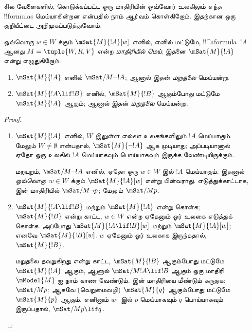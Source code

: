 \documentclass[../../../include/open-logic-section]{subfiles}
\begin{document}


சில வேளைகளில், கொடுக்கப்பட்ட ஒரு மாதிரியின் ஒவ்வோர் உலகிலும் எந்த
!!{formula}s மெய்யாகின்றன என்பதில் நாம் ஆர்வம் கொள்கிறோம். இதற்கான ஒரு
குறியீட்டை அறிமுகப்படுத்துவோம்.

\begin{defn}
  ஒவ்வொரு $w \in W$ க்கும் $\mSat{M}{!A}[w]$ எனில், எனில் மட்டுமே,
  !!^a{formula}~$!A$ ஆனது $M = \tuple{W, R, V}$ என்ற \emph{மாதிரியில்
  மெய்}; இதனை $\mSat{M}{!A}$ என்று எழுதுகிறோம்.
\end{defn}

\begin{prop}
  \begin{enumerate}
  \item $\mSat{M}{!A}$ எனில் $\mSat/{M}{\lnot !A}$; ஆனால் இதன்
    \emph{மறுதலை} மெய்யன்று.
  \item $\mSat{M}{!A \lif !B}$ எனில், $\mSat{M}{!B}$ ஆகும்போது மட்டுமே
    $\mSat{M}{!A}$ ஆகும்; ஆனால் இதன் \emph{மறுதலை} மெய்யன்று.
  \end{enumerate}
\end{prop}

\begin{proof}
  \begin{enumerate}
  \item $\mSat{M}{!A}$ எனில், $W$ இலுள்ள எல்லா உலகங்களிலும் $!A$
    மெய்யாகும். மேலும் $W \neq \emptyset$ என்பதால்,
    $\mSat{M}{\lnot!A}$ ஆக முடியாது; அப்படியானால் ஏதோ ஒரு உலகில் $!A$
    மெய்யாகவும் பொய்யாகவும் இருக்க வேண்டியிருக்கும்.

    மறுபுறம், $\mSat/{M}{\lnot !A}$ எனில், ஏதோ ஒரு $w \in W$ இல் $!A$
    மெய்யாகும். இதனால் \emph{ஒவ்வொரு}~$w \in W$ க்கும்
    $\mSat{M}{!A}[w]$ என்று பின்வராது. எடுத்துக்காட்டாக,
     இன் மாதிரியில் $\mSat/{M}{\lnot p}$; மேலும்
    $\mSat/{M}{p}$.
  \item $\mSat{M}{!A \lif !B}$ மற்றும் $\mSat{M}{!A}$ என்று கொள்க;
    $\mSat{M}{!B}$ என்று காட்ட, $w \in W$ என்ற ஏதேனும் ஓர் உலகை எடுத்துக்
    கொள்க. அப்போது $\mSat{M}{!A \lif !B}[w]$ மற்றும்
    $\mSat{M}{!A}[w]$; எனவே $\mSat{M}{!B}[w]$. $w$ ஏதேனும் ஓர் உலகாக
    இருந்ததால், $\mSat{M}{!B}$.

    மறுதலை தவறுகிறது என்று காட்ட, $\mSat{M}{!B}$ ஆகும்போது மட்டுமே
    $\mSat{M}{!A}$ ஆகும், ஆனால் $\mSat/{M}{!A \lif !B}$ ஆகும் ஒரு மாதிரி
    $\mModel{M}$ ஐ நாம் காண வேண்டும்.  இன் மாதிரியை
    மீண்டும் கருதுக: $\mSat/{M}{p}$; ஆகவே (வெறுமைவழி) $\mSat{M}{q}$
    ஆகும்போது மட்டுமே $\mSat{M}{p}$ ஆகும். எனினும் $w_1$ இல் $p$ மெய்யாகவும்
    $q$ பொய்யாகவும் இருப்பதால், $\mSat/{M}{p \lif q}$.
  \end{enumerate}
\end{proof}
\end{document}
